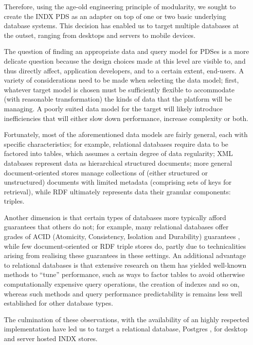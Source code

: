 \documentclass[graybox]{svmult}
\begin{document}
Therefore, using the age-old engineering principle of modularity, we sought to create the INDX PDS as an adapter on top of one or two basic underlying database systems.  This decision has enabled us to target multiple databases at the outset, ranging from desktops and servers to mobile devices. 

The question of finding an appropriate data and query model for PDSes is a more delicate question because the design choices made at this level are visible to, and thus directly affect, application developers, and to a certain extent, end-users.  A variety of considerations need to be made when selecting the data model; first, whatever target model is chosen must be sufficiently flexible to accommodate (with reasonable transformation) the kinds of data that the platform will be managing.  A poorly suited data model for the target will likely introduce inefficiencies that will either slow down performance, increase complexity or both.

Fortunately, most of the aforementioned data models are fairly general, each with specific characteristics; for example, relational databases require data to be factored into tables, which assumes a certain degree of data regularity; XML databases represent data as hierarchical structured documents; more general document-oriented stores manage collections of (either structured or unstructured) documents with limited metadata (comprising sets of keys for retrieval), while RDF ultimately represents data their granular components: triples.  

Another dimension is that certain types of databases more typically afford guarantees that others do not; for example, many relational databases offer grades of ACID (Atomicity, Consistency, Isolation and Durability) guarantees \cite{muth1991atomic}, while few document-oriented or RDF triple stores do, partly due to technicalities arising from realising these guarantees in these settings.  An additional advantage to relational databases is that extensive research on them has yielded well-known methods to “tune” performance, such as ways to factor tables to avoid otherwise computationally expensive query operations, the creation of indexes and so on, whereas such methods and query performance predictability is remains less well established for other database types.

The culmination of these observations, with the availability of an highly respected implementation have led us to target a relational database, Postgres \cite{stonebraker1986design}, for desktop and server hosted INDX stores.  
\end{document}
